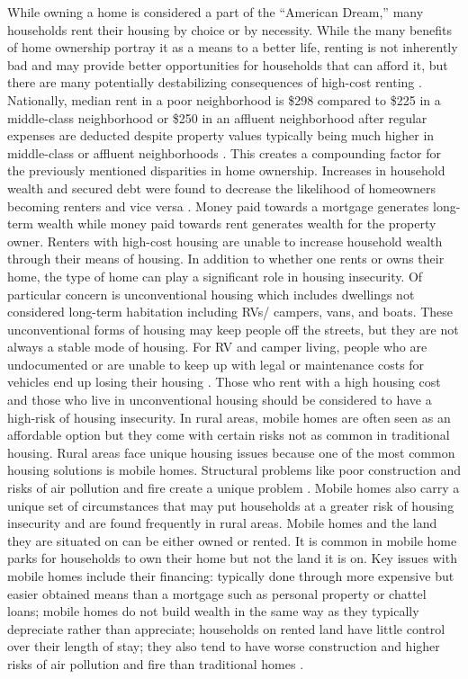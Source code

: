 While owning a home is considered a part of the “American Dream,” many households rent their housing by choice or by necessity. While the many benefits of home ownership portray it as a means to a better life, renting is not inherently bad and may provide better opportunities for households that can afford it, but there are many potentially destabilizing consequences of high-cost renting \citep{drew_believing_2014}. Nationally, median rent in a poor neighborhood is \$298 compared to \$225 in a middle-class neighborhood or \$250 in an affluent neighborhood after regular expenses are deducted despite property values typically being much higher in middle-class or affluent neighborhoods \citep{desmond_poor_2019}. This creates a compounding factor for the previously mentioned disparities in home ownership. Increases in household wealth and secured debt were found to decrease the likelihood of homeowners becoming renters and vice versa \citep{anderson_effect_2021}. Money paid towards a mortgage generates long-term wealth while money paid towards rent generates wealth for the property owner. Renters with high-cost housing are unable to increase household wealth through their means of housing.  In addition to whether one rents or owns their home, the type of home can play a significant role in housing insecurity. Of particular concern is unconventional housing which includes dwellings not considered long-term habitation including RVs/ campers, vans, and boats. These unconventional forms of housing may keep people off the streets, but they are not always a stable mode of housing. For RV and camper living, people who are undocumented or are unable to keep up with legal or maintenance costs for vehicles end up losing their housing \citep{wakin_not_2005}. Those who rent with a high housing cost and those who live in unconventional housing should be considered to have a high-risk of housing insecurity. In rural areas, mobile homes are often seen as an affordable option but they come with certain risks not as common in traditional housing. Rural areas face unique housing issues because one of the most common housing solutions is mobile homes. Structural problems like poor construction and risks of air pollution and fire create a unique problem \citep{mactavish_policy_2006}. Mobile homes also carry a unique set of circumstances that may put households at a greater risk of housing insecurity and are found frequently in rural areas. Mobile homes and the land they are situated on can be either owned or rented. It is common in mobile home parks for households to own their home but not the land it is on. Key issues with mobile homes include their financing: typically done through more expensive but easier obtained means than a mortgage such as personal property or chattel loans; mobile homes do not build wealth in the same way as they typically depreciate rather than appreciate; households on rented land have little control over their length of stay; they also tend to have worse construction and higher risks of air pollution and fire than traditional homes \citep{mactavish_wrong_2007}. 



